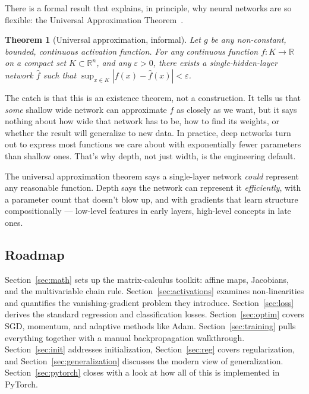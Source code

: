 \documentclass[11pt, a4paper]{article}
\newtheorem{theorem}{Theorem}
\newcommand{\R}{\mathbb{R}}
\begin{document}
There is a formal result that explains, in principle, why neural networks are so flexible: the Universal Approximation Theorem~\cite{hornik1991}.

\begin{theorem}[Universal approximation, informal]
Let $g$ be any non-constant, bounded, continuous activation function. For any continuous function $f: K \to \R$ on a compact set $K \subset \R^n$, and any $\varepsilon > 0$, there exists a single-hidden-layer network $\hat f$ such that $\sup_{x \in K} |f(x) - \hat f(x)| < \varepsilon$.
\end{theorem}

\noindent
The catch is that this is an existence theorem, not a construction. It tells us that \emph{some} shallow wide network can approximate $f$ as closely as we want, but it says nothing about how wide that network has to be, how to find its weights, or whether the result will generalize to new data. In practice, deep networks turn out to express most functions we care about with exponentially fewer parameters than shallow ones. That's why depth, not just width, is the engineering default.

\begin{intuitionbox}
The universal approximation theorem says a single-layer network \emph{could} represent any reasonable function. Depth says the network can represent it \emph{efficiently}, with a parameter count that doesn't blow up, and with gradients that learn structure compositionally --- low-level features in early layers, high-level concepts in late ones.
\end{intuitionbox}

\subsection{Roadmap}

Section~\ref{sec:math} sets up the matrix-calculus toolkit: affine maps, Jacobians, and the multivariable chain rule. Section~\ref{sec:activations} examines non-linearities and quantifies the vanishing-gradient problem they introduce. Section~\ref{sec:loss} derives the standard regression and classification losses. Section~\ref{sec:optim} covers SGD, momentum, and adaptive methods like Adam. Section~\ref{sec:training} pulls everything together with a manual backpropagation walkthrough. Section~\ref{sec:init} addresses initialization, Section~\ref{sec:reg} covers regularization, and Section~\ref{sec:generalization} discusses the modern view of generalization. Section~\ref{sec:pytorch} closes with a look at how all of this is implemented in PyTorch.
\end{document}
